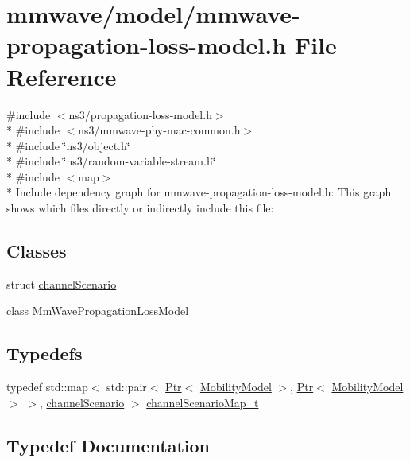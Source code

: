 \hypertarget{mmwave-propagation-loss-model_8h}{}\section{mmwave/model/mmwave-\/propagation-\/loss-\/model.h File Reference}
\label{mmwave-propagation-loss-model_8h}
{\ttfamily \#include $<$ns3/propagation-\/loss-\/model.\+h$>$}\\*
{\ttfamily \#include $<$ns3/mmwave-\/phy-\/mac-\/common.\+h$>$}\\*
{\ttfamily \#include \char`\"{}ns3/object.\+h\char`\"{}}\\*
{\ttfamily \#include \char`\"{}ns3/random-\/variable-\/stream.\+h\char`\"{}}\\*
{\ttfamily \#include $<$map$>$}\\*
Include dependency graph for mmwave-\/propagation-\/loss-\/model.h\+:
This graph shows which files directly or indirectly include this file\+:
\subsection*{Classes}
\begin{DoxyCompactItemize}
\item 
struct \hyperlink{structchannelScenario}{channel\+Scenario}
\item 
class \hyperlink{classMmWavePropagationLossModel}{Mm\+Wave\+Propagation\+Loss\+Model}
\end{DoxyCompactItemize}
\subsection*{Typedefs}
\begin{DoxyCompactItemize}
\item 
typedef std\+::map$<$ std\+::pair$<$ \hyperlink{classns3_1_1Ptr}{Ptr}$<$ \hyperlink{classns3_1_1MobilityModel}{Mobility\+Model} $>$, \hyperlink{classns3_1_1Ptr}{Ptr}$<$ \hyperlink{classns3_1_1MobilityModel}{Mobility\+Model} $>$ $>$, \hyperlink{structchannelScenario}{channel\+Scenario} $>$ \hyperlink{mmwave-propagation-loss-model_8h_a33be62e54e7d66f3d40b8806e882a4b0}{channel\+Scenario\+Map\+\_\+t}
\end{DoxyCompactItemize}


\subsection{Typedef Documentation}
